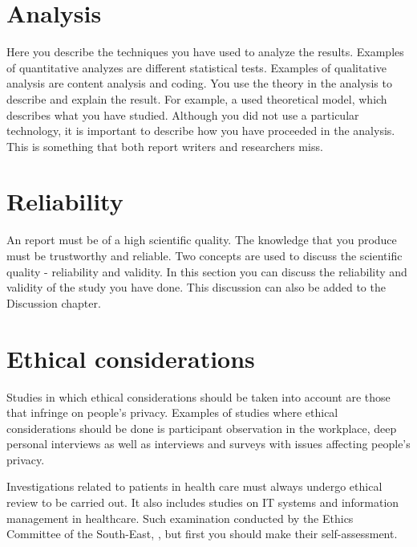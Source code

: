 \section{Analysis}
Here you describe the techniques you have used to analyze the results. Examples of quantitative analyzes are different statistical tests. Examples of qualitative analysis are content analysis and coding. You use the theory in the analysis to describe and explain the result. For example, a used theoretical model, which describes what you have studied. Although you did not use a particular technology, it is important to describe how you have proceeded in the analysis. This is something that both report writers and researchers miss.

\section{Reliability}
An report must be of a high scientific quality. The knowledge that you produce must be trustworthy and reliable. Two concepts are used to discuss the scientific quality - reliability and validity. In this section you can discuss the reliability and validity of the study you have done. This discussion can also be added to the Discussion chapter.

\section{Ethical considerations}
Studies in which ethical considerations should be taken into account are those that infringe on people's privacy. Examples of studies where ethical considerations should be done is participant observation in the workplace, deep personal interviews as well as interviews and surveys with issues affecting people's privacy.

Investigations related to patients in health care must always undergo ethical review to be carried out. It also includes studies on IT systems and information management in healthcare. Such examination conducted by the Ethics Committee of the South-East, \cite{etik}, but first you should make their self-assessment.
